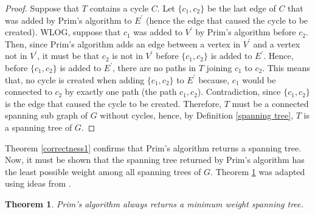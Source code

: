 \documentclass[12pt]{article}
\newtheorem{theorem}[definition]{Theorem}
\numberwithin{equation}{subsection}
\numberwithin{table}{subsection}
\begin{document}
\begin{proof}
Suppose that $T$ contains a cycle $C$. Let $\{c_1, c_2\}$ be the last edge of $C$ that was added by Prim's algorithm to $E^\prime$ (hence the edge that caused the cycle to be created). WLOG, suppose that $c_1$ was added to $V^\prime$ by Prim's algorithm before $c_2$. Then, since Prim's algorithm adds an edge between a vertex in $V^\prime$ and a vertex not in $V^\prime$, it must be that $c_2$ is not in $V^\prime$ before $\{c_1, c_2\}$ is added to $E^\prime$. Hence, before $\{c_1, c_2\}$ is added to $E^\prime$, there are no paths in $T$ joining $c_1$ to $c_2$. This means that, no cycle is created when adding $\{c_1, c_2\}$ to $E^\prime$ because, $c_1$ would be connected to $c_2$ by exactly one path (the path $c_1, c_2$). Contradiction, since $\{c_1, c_2\}$ is the edge that caused the cycle to be created. Therefore, $T$ must be a connected spanning sub graph of $G$ without cycles, hence, by Definition \ref{spanning tree}, $T$ is a spanning tree of $G$.
\end{proof}
Theorem \ref{correctness1} confirms that Prim's algorithm returns a spanning tree. Now, it must be shown that the spanning tree returned by Prim's algorithm has the least possible weight among all spanning trees of $G$. Theorem \ref{correctness2} was adapted using ideas from \cite{prim's_algorithm}.
\begin{theorem}
Prim's algorithm always returns a minimum weight spanning tree. {}
\label{correctness2}
\end{theorem}
\end{document}
